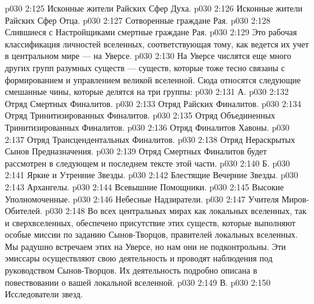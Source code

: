 \vs p030 2:125 \bibnobreakspace Исконные жители Райских Сфер Духа.
\vs p030 2:126 \bibnobreakspace Исконные жители Райских Сфер Отца.
\vs p030 2:127 \bibnobreakspace Сотворенные граждане Рая.
\vs p030 2:128 \bibnobreakspace Слившиеся с Настройщиками смертные граждане Рая.
\vs p030 2:129 \pc Это рабочая классификация личностей вселенных, соответствующая тому, как ведется их учет в центральном мире --- на Уверсе.
\vs p030 2:130 \pc {} На Уверсе числятся еще много других групп разумных существ --- существ, которые тоже тесно связаны с формированием и управлением великой вселенной. Сюда относятся следующие смешанные чины, которые делятся на три группы:
\vs p030 2:131 \pc А. 
\vs p030 2:132 \bibnobreakspace Отряд Смертных Финалитов.
\vs p030 2:133 \bibnobreakspace Отряд Райских Финалитов.
\vs p030 2:134 \bibnobreakspace Отряд Тринитизированных Финалитов.
\vs p030 2:135 \bibnobreakspace Отряд Объединенных Тринитизированных Финалитов.
\vs p030 2:136 \bibnobreakspace Отряд Финалитов Хавоны.
\vs p030 2:137 \bibnobreakspace Отряд Трансцендентальных Финалитов.
\vs p030 2:138 \bibnobreakspace Отряд Нераскрытых Сынов Предназначения.
\vs p030 2:139 \pc Отряд Смертных Финалитов будет рассмотрен в следующем и последнем тексте этой части.
\vs p030 2:140 \pc Б. 
\vs p030 2:141 \bibnobreakspace Яркие и Утренние Звезды.
\vs p030 2:142 \bibnobreakspace Блестящие Вечерние Звезды.
\vs p030 2:143 \bibnobreakspace Архангелы.
\vs p030 2:144 \bibnobreakspace Всевышние Помощники.
\vs p030 2:145 \bibnobreakspace Высокие Уполномоченные.
\vs p030 2:146 \bibnobreakspace Небесные Надзиратели.
\vs p030 2:147 \bibnobreakspace Учителя Миров\hyp{}Обителей.
\vs p030 2:148 \pc Во всех центральных мирах как локальных вселенных, так и сверхвселенных, обеспечено присутствие этих существ, которые выполняют особые миссии по заданию Сынов\hyp{}Творцов, правителей локальных вселенных. Мы радушно встречаем этих  на Уверсе, но нам они не подконтрольны. Эти эмиссары осуществляют свою деятельность и проводят наблюдения под руководством Сынов\hyp{}Творцов. Их деятельность подробно описана в повествовании о вашей локальной вселенной.
\vs p030 2:149 \pc В. 
\vs p030 2:150 \bibnobreakspace Исследователи звезд.
